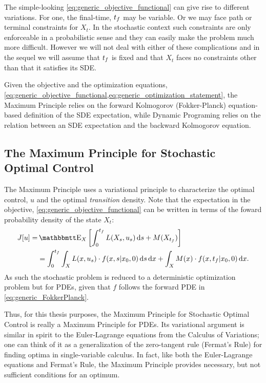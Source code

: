 The simple-looking \cref{eq:generic_objective_functional} can give rise to
different variations. For one, the final-time, ${ t_f }$ may be variable. Or we may
face path or terminal constraints for $X_t$. In the stochastic context such
constraints are only enforceable in a probabilistic sense and they can easily
make the problem much more difficult. However we will not deal with either of
these complications and in the sequel we will assume that ${ t_f }$ is fixed and
that $X_t$ faces no constraints other than that it satisfies its SDE.

Given the objective and the optimization equations,
\cref{eq:generic_objective_functional,eq:generic_optimization_statement}, the
Maximum Principle relies on the forward Kolmogorov (Fokker-Planck)
equation-based definition of the SDE expectation, while Dynamic Programing
relies on the relation between an SDE expectation and the backward Kolmogorov
equation.


\subsection{The Maximum Principle for Stochastic Optimal Control} 
\label{sec:maximum_principle_4_stochastic_control}
The Maximum Principle uses a variational principle to characterize the optimal
control, $u$ and the optimal {\sl transition } density. Note that the
expectation in the objective, \cref{eq:generic_objective_functional} can be written in terms of the foward
probability density of the state $X_t$:
\begin{align}
J[u] =&  \Exp_X \left[ \int_0^\tf L(X_s, u_s) \intd{s} + M(X_\tf) \right]
\notag \\
&=  \int_0^\tf\int_X L(x, u_s) \cdot f(x,s|x_0,0) \intd{s}\intd{x} 
+ \int_X  M(x)\cdot f(x,\tf|x_0,0)\intd{x}.
\label{eq:generic_objective_functional_in_terms_of_forward_density}
\end{align}
As such the stochastic problem is reduced to a deterministic optimization
problem but for PDEs, given that $f$ follows the forward PDE in
\cref{eq:generic_FokkerPlanck}. 

Thus, for this thesis purposes, the Maximum Principle for Stochastic Optimal
Control is really a Maximum Principle for PDEs. Its variational argument is
similar in spirit to the Euler-Lagrange equations from the Calculus of
Variations; one can think of it as a generalization of the zero-tangent
rule (Fermat's Rule) for finding optima in single-variable calculus. In fact,
like both the Euler-Lagrange equations and Fermat's Rule, the Maximum Principle
provides necessary, but not sufficient conditions for an optimum.

